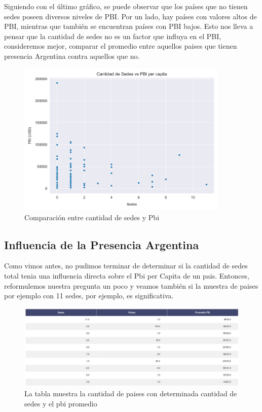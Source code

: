 \documentclass[10pt,a4paper]{article}
\begin{document}
Siguiendo con el último gráfico, se puede observar que los países que no tienen sedes  poseen  diversos  niveles de PBI. Por un lado, hay países con valores altos de PBI, mientras que también se encuentran países con PBI bajos. Esto nos lleva a pensar que la cantidad de sedes no es un factor que influya en el PBI, consideremos mejor, comparar el promedio entre aquellos paises que tienen presencia Argentina contra aquellos que no. 

\newpage

\begin{figure}[!] %
  \centering
  \includegraphics[width=0.9\textwidth]{plot_pbi.png}
  \caption{Comparación entre cantidad de sedes y Pbi}
  \label{fig:Tabla 2}
\end{figure} \vspace{0.1cm}


\subsection{Influencia de la Presencia Argentina} \vspace{0.3cm}

Como vimos antes, no pudimos terminar de determinar si la cantidad de sedes total tenia una influencia directa sobre el Pbi per Capita de un pais. Entonces, reformulemos nuestra pregunta un poco y veamos también si la muestra de paises por ejemplo con 11 sedes, por ejemplo, es significativa.

\begin{figure}[h!]
  \centering
  \includegraphics[width=1\textwidth]{TABLAConclusion1.png}
  \caption{La tabla muestra la cantidad de paises con determinada cantidad de sedes y el pbi promedio}
  \label{fig:Tabla Conclusion}
\end{figure} 
\end{document}
